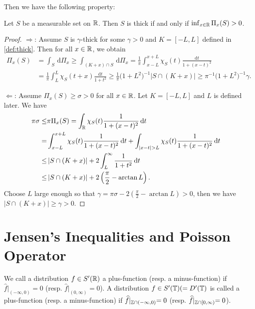 Then we have the following property:
\begin{proposition} \label{prp:equiv}
	Let $S$ be a measurable set on $\mathbb{R}$. Then $S$ is thick if and only if $\inf_{x\in \mathbb{R}}\Pi_x(S)>0$.
\end{proposition}
\begin{proof}
	$\Rightarrow$: Assume $S$ is $\gamma$-thick for some $\gamma>0$ and $K=[-L,L]$ defined in \cref{def:thick}. Then for all $x\in\mathbb{R}$, we obtain
	\begin{align*}
		\Pi_x(S)&=\int_{S}\,\mathrm{d}\Pi_x\ge \int_{(K+x)\cap S}\,\mathrm{d}\Pi_x=\frac{1}{\pi}\int_{x-L}^{x+L}\chi_S(t) \frac{\mathrm{d} t}{1+(x-t)^2}\\
			&= \frac{1}{\pi}\int_L^L\chi_S(t+x) \frac{\mathrm{d} t}{1+t^2}\ge \frac{1}{\pi}\bigl( 1+L^2\bigr)^{-1}\left|S\cap(K+x)\right|\ge \pi^{-1}\bigl(1+L^2\bigr)^{-1}\gamma
	.\end{align*}

	$\Leftarrow$: Assume $\Pi_x(S)\ge \sigma>0$ for all $x\in\mathbb{R}$. Let $K=[-L,L]$ and $L$ is defined later. We have
	\begin{align*}
		\pi \sigma \le & \pi \Pi_x(S) = \int_{\R} \chi_S(t) \frac{1}{1+(x-t)^2}\d t\\
		= & \int_{x-L}^{x+L} \chi_S(t) \frac{1}{1+(x-t)^2}\d t+\int_{|x-t|>L}\chi_{S}(t) \frac{1}{1+(x-t)^2}\d t\\
		\le & \left|S\cap (K+x)\right|+2\int_{L}^{\infty} \frac{1}{1+t^2}\d t\\
		\le &\left| S\cap (K+x)\right|+2\left(\frac{\pi}{2}-\arctan L\right)
	.\end{align*}
	Choose $L$ large enough so that  $\gamma=\pi \sigma -2\left(\frac{\pi}{2}-\arctan L\right)>0 $, then we have $\left| S\cap (K+x)\right|\ge \gamma>0$.
\end{proof}

\section{Jensen's Inequalities and Poisson Operator} 

\begin{definition}
	We call a distribution $f \in S'(\mathbb{R})$ a plus-function (resp. a minus-function) if $\widehat{f}\lvert_{(-\infty,0)}=0$ (resp. $\widehat{f}\lvert_{(0,\infty)}=0$). A distribution $f\in S'(\mathbb{T})(=D'(\mathbb{T})$ is called a plus-function (resp. a minus-function) if $\widehat{f}\lvert_{\mathbb{Z}\cap(-\infty,0)}=0$ (resp. $\widehat{f}\lvert_{\mathbb{Z}\cap [0,\infty)}=0$).
\end{definition}

